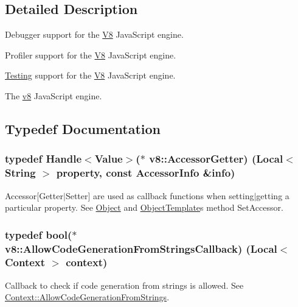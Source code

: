 \subsection{Detailed Description}
Debugger support for the \hyperlink{classv8_1_1_v8}{V8} Java\+Script engine.

Profiler support for the \hyperlink{classv8_1_1_v8}{V8} Java\+Script engine.

\hyperlink{classv8_1_1_testing}{Testing} support for the \hyperlink{classv8_1_1_v8}{V8} Java\+Script engine.

The \hyperlink{namespacev8}{v8} Java\+Script engine. 

\subsection{Typedef Documentation}
\hypertarget{namespacev8_a3016fe071826349d1370a700e71be094}{}
\subsubsection[{Accessor\+Getter}]{\setlength{\rightskip}{0pt plus 5cm}typedef {\bf Handle}$<${\bf Value}$>$($\ast$ v8\+::\+Accessor\+Getter) ({\bf Local}$<$ {\bf String} $>$ property, const {\bf Accessor\+Info} \&info)}\label{namespacev8_a3016fe071826349d1370a700e71be094}
Accessor\mbox{[}Getter$\vert$\+Setter\mbox{]} are used as callback functions when setting$\vert$getting a particular property. See \hyperlink{classv8_1_1_object}{Object} and \hyperlink{classv8_1_1_object_template}{Object\+Template}\textquotesingle{}s method Set\+Accessor. \hypertarget{namespacev8_a521d909ec201742a1cb35d50a8e2a3c2}{}
\subsubsection[{Allow\+Code\+Generation\+From\+Strings\+Callback}]{\setlength{\rightskip}{0pt plus 5cm}typedef bool($\ast$ v8\+::\+Allow\+Code\+Generation\+From\+Strings\+Callback) ({\bf Local}$<$ {\bf Context} $>$ context)}\label{namespacev8_a521d909ec201742a1cb35d50a8e2a3c2}
Callback to check if code generation from strings is allowed. See \hyperlink{classv8_1_1_context_a794ccc42113566f5d363f89c8b0d3c2c}{Context\+::\+Allow\+Code\+Generation\+From\+Strings}. \hypertarget{namespacev8_ab699f4bbbb56350e6e915682e420fcdc}{}
